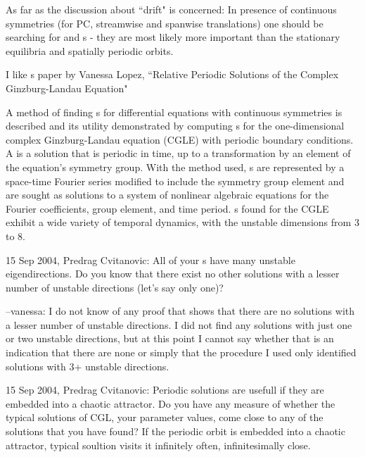 As far as the discussion about ``drift" is concerned:
In presence of continuous symmetries (for PC, streamwise and
spanwise translations) one should be searching for
{\reqva} and
{\rpo s} - they are most likely more important than
the stationary equilibria and spatially periodic orbits.

I like {\rpo s} paper by
Vanessa Lopez,
``Relative Periodic Solutions of the Complex Ginzburg-Landau Equation"


A method of finding {\rpo s} for differential equations with
continuous symmetries is described and its utility demonstrated by computing
{\rpo s} for the one-dimensional complex Ginzburg-Landau
equation (CGLE) with periodic boundary conditions.  A {\rpo} is
a solution that is periodic in time, up to a transformation by an element of the
equation's symmetry group.  With the method used, {\rpo s} are
represented by a space-time Fourier series modified to include the symmetry
group element and are sought as solutions to a system of nonlinear algebraic
equations for the Fourier coefficients, group element, and time period.
{\Rpo s} found for the CGLE exhibit a wide variety of temporal
dynamics,
with the %
unstable dimensions from 3 to 8.

15 Sep 2004, Predrag Cvitanovic:
All of your {\Rpo s} have many unstable
eigendirections. Do you know that there exist no other solutions with a
lesser number of unstable directions (let's say only one)?

--vanessa:
I do not know of any proof that shows that there are no solutions with a
lesser number of unstable directions.  I did not find any solutions with
just one or two unstable directions, but at this point I cannot say
whether that is an indication that there are none or simply that
the procedure I used only identified solutions with 3+ unstable
directions.

15 Sep 2004, Predrag Cvitanovic:
Periodic solutions are usefull if they are embedded into a chaotic
attractor. Do you have any measure of whether the typical solutions of
CGL, your parameter values, come close to any of the solutions that you
have found? If the periodic orbit is embedded into a chaotic attractor,
typical soultion visits it infinitely often, infinitesimally close.

